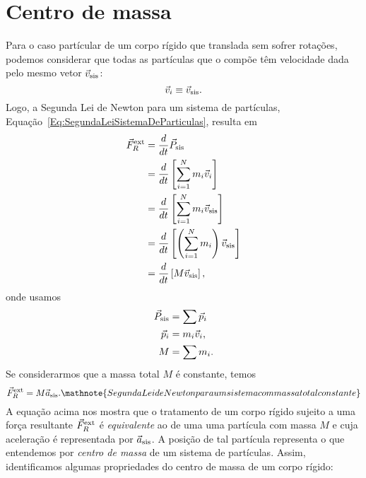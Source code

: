 \section{Centro de massa}
\label{Sec:CentroDeMassa}


Para o caso partícular de um corpo rígido que translada sem sofrer rotações, podemos considerar que todas as partículas que o compõe têm velocidade dada pelo mesmo vetor $\vec{v}_{\rm{sis}}$:
\begin{equation}
    \vec{v}_i \equiv \vec{v}_{\rm{sis}}.
\end{equation}
%
Logo, a Segunda Lei de Newton para um sistema de partículas, Equação~\eqref{Eq:SegundaLeiSistemaDeParticulas}, resulta em
\begin{align}
    \vec{F}_{R}^{\rm{ext}} &= \frac{d}{dt}\vec{P}_{\rm{sis}} \\
    &= \frac{d}{dt} \left[\sum_{i=1}^N m_i\vec{v}_i\right] \\
    &= \frac{d}{dt} \left[\sum_{i=1}^N m_i\vec{v}_{\rm{sis}}\right] \\
    &= \frac{d}{dt} \left[\left(\sum_{i=1}^N m_i\right) \vec{v}_{\rm{sis}}\right] \\
    &= \frac{d}{dt} \left[M \vec{v}_{\rm{sis}}\right],
\end{align}
%
onde usamos
\begin{align}
    \vec{P}_{\rm{sis}} &= \sum \vec{p}_i \\
    \vec{p}_i &= m_i\vec{v}_i, \\
    M &= \sum m_i.
\end{align}
%
Se considerarmos que a massa total $M$ é constante, temos
\begin{equation}\label{Eq:SegundaLeiSistemaDeParticulasMConst}
	\vec{F}_{R}^{\rm{ext}} = M \vec{a}_{\rm{sis}}. \mathnote{Segunda Lei de Newton para um sistema com massa total constante}
\end{equation}
%
A equação acima nos mostra que o tratamento de um corpo rígido sujeito a uma força resultante $\vec{F}_{R}^{\rm{ext}}$ é \emph{equivalente} ao de uma uma partícula com massa $M$ e cuja aceleração é representada por $\vec{a}_{\rm{sis}}$. A posição de tal partícula representa o que entendemos por \emph{centro de massa} de um sistema de partículas. Assim, identificamos algumas propriedades do centro de massa de um corpo rígido:
